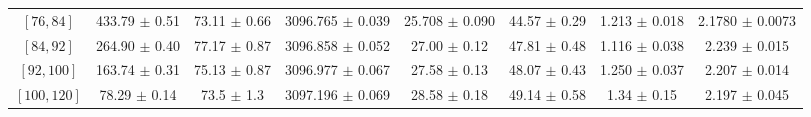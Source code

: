 \begin{tabular}{c||c|c|c|c|c|c|c}
$[76, 84]$ & 433.79 $\pm$ 0.51 & 73.11 $\pm$ 0.66 & 3096.765 $\pm$ 0.039 & 25.708 $\pm$ 0.090 & 44.57 $\pm$ 0.29 & 1.213 $\pm$ 0.018 & 2.1780 $\pm$ 0.0073\\
$[84, 92]$ & 264.90 $\pm$ 0.40 & 77.17 $\pm$ 0.87 & 3096.858 $\pm$ 0.052 & 27.00 $\pm$ 0.12 & 47.81 $\pm$ 0.48 & 1.116 $\pm$ 0.038 & 2.239 $\pm$ 0.015\\
$[92, 100]$ & 163.74 $\pm$ 0.31 & 75.13 $\pm$ 0.87 & 3096.977 $\pm$ 0.067 & 27.58 $\pm$ 0.13 & 48.07 $\pm$ 0.43 & 1.250 $\pm$ 0.037 & 2.207 $\pm$ 0.014\\
$[100, 120]$ & 78.29 $\pm$ 0.14 & 73.5 $\pm$ 1.3 & 3097.196 $\pm$ 0.069 & 28.58 $\pm$ 0.18 & 49.14 $\pm$ 0.58 & 1.34 $\pm$ 0.15 & 2.197 $\pm$ 0.045\\
\end{tabular}
